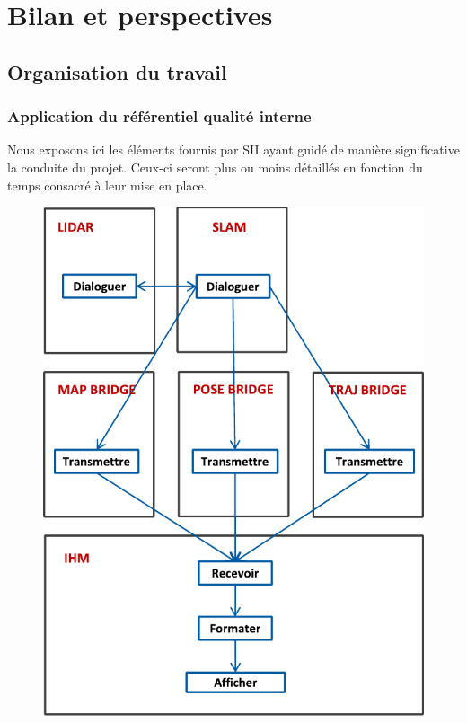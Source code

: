 \chapter{Bilan et perspectives}
\label{chap:bilan}

\section{Organisation du travail}
\label{sec:orga}
  \subsection{Application du référentiel qualité interne}
  \label{sec:qualite-interne}

  Nous exposons ici les éléments fournis par SII ayant guidé de manière significative la conduite du projet. 
  Ceux-ci seront plus ou moins détaillés en fonction du temps consacré à leur mise en place.
  
    \begin{figure}[h]
    \centering
      \includegraphics[width=.6\linewidth]{figures/rel-fonctions}  
    \label{fig:rel-fonctions}
  \end{figure}
  
